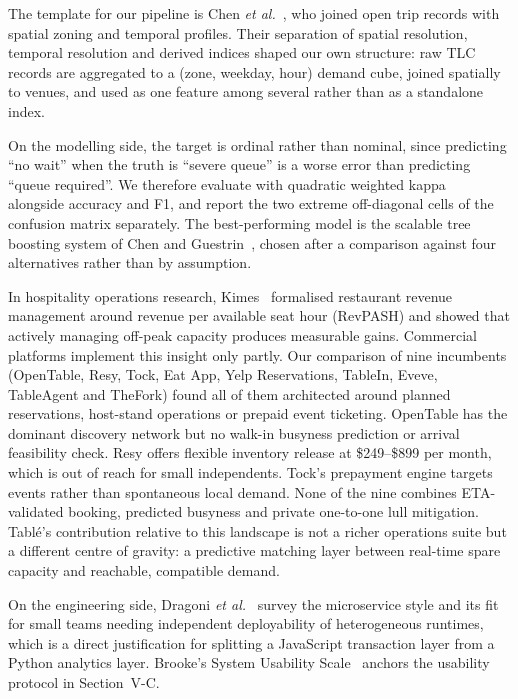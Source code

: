 \documentclass[conference]{IEEEtran}
\begin{document}
The template for our pipeline is Chen \textit{et al.}~\cite{b1}, who joined open trip records with spatial zoning and temporal profiles. Their separation of spatial resolution, temporal resolution and derived indices shaped our own structure: raw TLC records are aggregated to a (zone, weekday, hour) demand cube, joined spatially to venues, and used as one feature among several rather than as a standalone index.

On the modelling side, the target is ordinal rather than nominal, since predicting ``no wait'' when the truth is ``severe queue'' is a worse error than predicting ``queue required''. We therefore evaluate with quadratic weighted kappa~\cite{b12} alongside accuracy and F1, and report the two extreme off-diagonal cells of the confusion matrix separately. The best-performing model is the scalable tree boosting system of Chen and Guestrin~\cite{b11}, chosen after a comparison against four alternatives rather than by assumption.

In hospitality operations research, Kimes~\cite{b5} formalised restaurant revenue management around revenue per available seat hour (RevPASH) and showed that actively managing off-peak capacity produces measurable gains. Commercial platforms implement this insight only partly. Our comparison of nine incumbents (OpenTable, Resy, Tock, Eat App, Yelp Reservations, TableIn, Eveve, TableAgent and TheFork) found all of them architected around planned reservations, host-stand operations or prepaid event ticketing. OpenTable has the dominant discovery network but no walk-in busyness prediction or arrival feasibility check. Resy offers flexible inventory release at \$249--\$899 per month, which is out of reach for small independents. Tock's prepayment engine targets events rather than spontaneous local demand. None of the nine combines ETA-validated booking, predicted busyness and private one-to-one lull mitigation. Tabl\'{e}'s contribution relative to this landscape is not a richer operations suite but a different centre of gravity: a predictive matching layer between real-time spare capacity and reachable, compatible demand.

On the engineering side, Dragoni \textit{et al.}~\cite{b7} survey the microservice style and its fit for small teams needing independent deployability of heterogeneous runtimes, which is a direct justification for splitting a JavaScript transaction layer from a Python analytics layer. Brooke's System Usability Scale~\cite{b8} anchors the usability protocol in Section~V-C.
\end{document}
